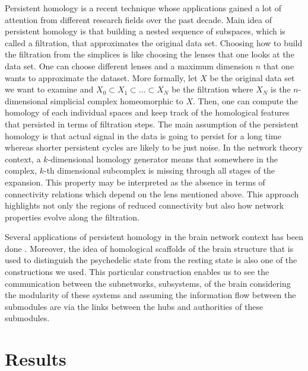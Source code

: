 \documentclass[9pt,twocolumn,twoside,lineno]{pnas-new}
\begin{document}
Persistent homology is a recent technique whose applications gained a lot of attention from different research fields over the past decade. Main idea of persistent homology is that building a nested sequence of subspaces, which is called a filtration, that approximates the original data set. Choosing how to build the filtration from the simplices is like choosing the lenses that one looks at the data set\cite{pershomsimplif}. One can choose different lenses and a maximum dimension $n$ that one wants to approximate the dataset. More formally, let $X$ be the original data set we want to examine and $X_{0}\subset X_{1}\subset...\subset X_{N}$ be the filtration where $X_{N} $ is the $n$-dimensional simplicial complex homeomorphic to $X$. Then, one can compute the homology of each individual spaces and keep track of the homological features that persisted in terms of filtration steps.  The main assumption of the persistent homology is that actual signal in the data is going to persist for a long time whereas shorter persistent cycles are likely to be just noise. In the network theory context, a $k$-dimensional homology generator means that somewhere in the complex, $k$-th dimensional subcomplex is missing through all stages of the expansion. This property may be interpreted as the absence in terms of connectivity relations which depend on the lens mentioned above. This approach highlights not only the regions of reduced connectivity but also how network properties evolve along the filtration.

Several applications of persistent homology in the brain network context has been done \cite{dendogram,pershombrainnetw,struc-funcpershom}. Moreover, the idea of homological scaffolds of the brain structure that is used to distinguish the psychedelic state from the resting state  \cite{scaffold} is also one of the constructions we used. This particular construction enables us to see the communication between the subnetworks, subsystems, of the brain considering the modularity of these systems and assuming the information flow between the submodules are via the links between the hubs and authorities of these submodules.




\section*{Results}
\end{document}
